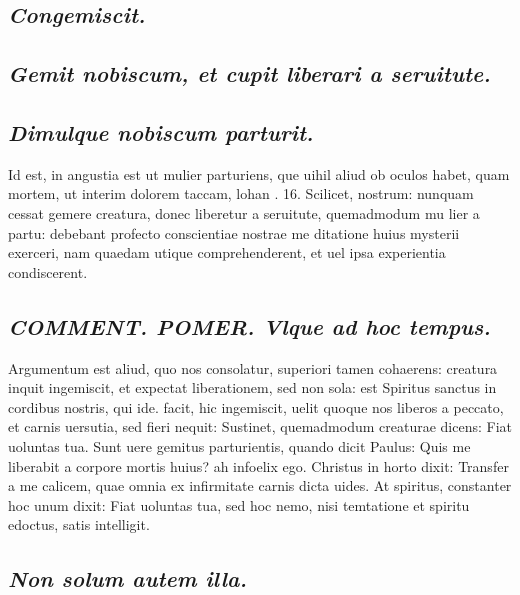 \documentclass{article}
\begin{document}
\begin{pages}
\subsection*{\textit{Congemiscit. }}
{}
\subsection*{\textit{Gemit nobiscum, et cupit liberari a seruitute.  }}
{}
\subsection*{\textit{Dimulque nobiscum parturit. }}\pstart Id est, in angustia est ut mulier parturiens, que uihil aliud ob oculos habet, quam mortem, ut interim dolorem taccam, lohan . 16.   \pend{} Scilicet, nostrum: nunquam cessat gemere creatura, donec liberetur a seruitute, quemadmodum mu lier a partu: debebant profecto conscientiae nostrae me ditatione huius mysterii exerceri, nam quaedam utique  comprehenderent, et uel ipsa experientia condiscerent.   \pend
{}
{}
\subsection*{\textit{\huge\textbf{COMMENT. POMER. }\normalsize Vlque ad hoc tempus. }}\pstart Argumentum est aliud, quo nos consolatur, superiori tamen cohaerens: creatura inquit ingemiscit, et expectat liberationem, sed non sola: est Spiritus sanctus in cordibus nostris, qui ide. facit, hic ingemiscit, uelit quoque nos liberos a peccato, et carnis uersutia, sed fieri nequit: Sustinet, quemadmodum creaturae dicens: Fiat uoluntas tua. Sunt uere gemitus parturientis, quando dicit Paulus: Quis me liberabit a corpore mortis huius? ah infoelix ego. Christus in horto dixit: Transfer a me calicem, quae omnia ex infirmitate carnis dicta uides. At spiritus, constanter hoc unum dixit: Fiat uoluntas tua, sed hoc nemo, nisi temtatione et spiritu edoctus, satis intelligit.  \pend
{}
{}
\subsection*{\textit{Non solum autem illa. }}
{}

\end{pages}
\end{document}
